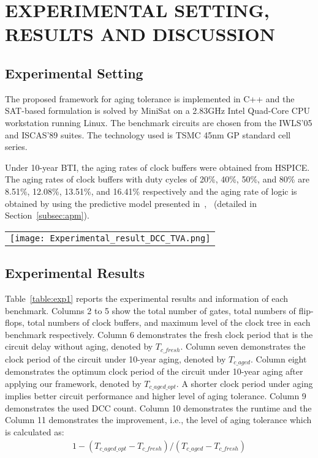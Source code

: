 \section{EXPERIMENTAL SETTING, RESULTS AND DISCUSSION}
\label{sec:exp}
\subsection{Experimental Setting}
The proposed framework for aging tolerance is implemented in C++ and the SAT-based formulation is solved by MiniSat on a 2.83GHz Intel Quad-Core CPU workstation running Linux. The benchmark circuits are chosen from the IWLS'05 and ISCAS'89 suites. The technology used is TSMC 45nm GP standard cell series.

Under 10-year BTI, the aging rates of clock buffers were obtained from HSPICE. The aging rates of clock buffers with duty cycles of 20\%, 40\%, 50\%, and 80\% are 8.51\%, 12.08\%, 13.51\%, and 16.41\% respectively and the aging rate of logic is obtained by using the predictive model presented in~\cite{wang2010impact},~\cite{wang2007efficient} (detailed in Section~\ref{subsec:apm}).

\begin{table*}
\centering
\caption{Results of aging tolerance}
	\begin{tabular}{l}
	\texttt{[image: Experimental\_result\_DCC\_TVA.png]} %
	\end{tabular}
\label{table:exp1}
\end{table*}

\subsection{Experimental Results}
Table~\ref{table:exp1} reports the experimental results and information of each benchmark. Columns 2 to 5 show the total number of gates, total numbers of flip-flops, total numbers of clock buffers, and maximum level of the clock tree in each benchmark respectively. Column 6 demonstrates the fresh clock period that is the circuit delay without aging, denoted by $T_{c\_fresh}$. Column seven demonstrates the clock period of the circuit under 10-year aging, denoted by $T_{c\_aged}$. Column eight demonstrates the optimum clock period of the circuit under 10-year aging after applying our framework, denoted by $T_{c\_aged\_opt}$. A shorter clock period under aging implies better circuit performance and higher level of aging tolerance. Column 9 demonstrates the used DCC count. Column 10 demonstrates the runtime and the Column 11 demonstrates the improvement, i.e., the level of aging tolerance which is calculated as:
\begin{gather*}
1 - (T_{c\_aged\_opt} - T_{c\_fresh}) / (T_{c\_aged} - T_{c\_fresh})
\end{gather*}


